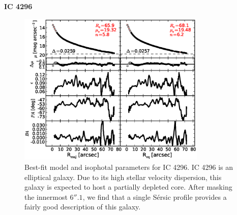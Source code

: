 \documentclass[preprint2]{emulateapj}
\newcommand{\fitfigurewidth}{0.8\textwidth}
\begin{document}
  \clearpage\newpage\noindent
  {\bf IC 4296 \\}

  \begin{figure}[h]
  \begin{center}
  \includegraphics[width=\fitfigurewidth]{images/ic4296_1Dfit.eps}
  \caption{Best-fit model and isophotal parameters for IC 4296.
  IC 4296 is an elliptical galaxy. 
  Due to its high stellar velocity dispersion, this galaxy is expected to host a partially depleted core. 
  After masking the innermost $6''.1$, 
  we find that a single S\'ersic profile provides a fairly good description of this galaxy.}
  \end{center}
  \end{figure}
\end{document}
